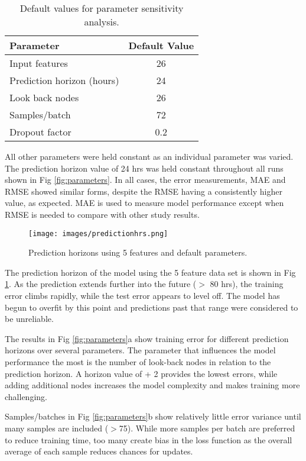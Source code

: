 \begin{table}[]
\centering
\caption{Default values for parameter sensitivity analysis.}
\label{tb:default-parameter}
\begin{tabular}{@{}lc@{}}
\toprule
\textbf{Parameter} & \textbf{Default Value} \\ \midrule
Input features & 26 \\
Prediction horizon (hours) & 24 \\
Look back nodes & 26 \\
Samples/batch & 72 \\
Dropout factor & 0.2 \\ \bottomrule
\end{tabular}
\end{table}
\begin{linenumbers}
%
All other parameters were held constant as an individual parameter was varied. The prediction horizon value of 24 hrs was held constant throughout all runs shown in  Fig \ref{fig:parameters}. In all cases, the error measurements, MAE and RMSE showed similar forms, despite the RMSE having a consistently higher value, as expected. MAE is used to measure model performance except when RMSE is needed to compare with other study results.  

%
\begin{figure}
\centering
\texttt{[image: images/predictionhrs.png]}  %
\caption{Prediction horizons using 5 features and default parameters.}
\label{fig:predictionhrs}
\end{figure}
%
The prediction horizon of the model using the 5 feature data set is shown in Fig \ref{fig:predictionhrs}.  As the prediction extends further into the future ($>$ 80 hrs), the training error climbs rapidly, while the test error appears to level off. The model has begun to overfit by this point and predictions past that range were considered to be unreliable.

The results in  Fig \ref{fig:parameters}a show training error for different prediction horizons over several parameters. The parameter that influences the model performance the most is the number of look-back nodes in relation to the prediction horizon. A horizon value of + 2 provides the lowest errors, while adding additional nodes increases the model complexity and makes training more challenging. 

Samples/batches in Fig \ref{fig:parameters}b show relatively little error variance until many samples are included ($>$75). While more samples per batch are preferred to reduce training time, too many create bias in the loss function as the overall average of each sample reduces chances for updates.


\end{linenumbers}
